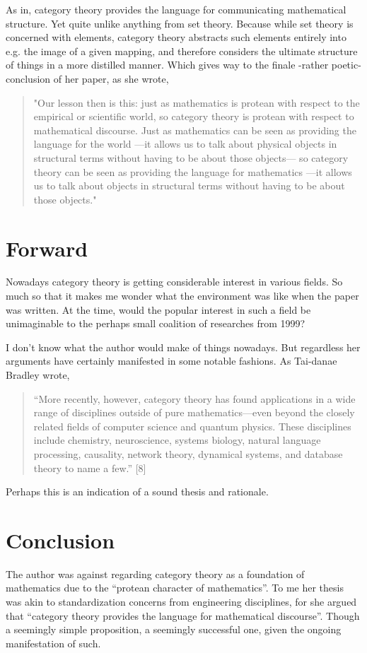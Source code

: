 As in, category theory provides the language for communicating mathematical structure. Yet quite unlike anything from set theory. Because while set theory is concerned with elements, category theory abstracts such elements entirely into e.g. the image of a given mapping, and therefore considers the ultimate structure of things in a more distilled manner. Which gives way to the finale -rather poetic- conclusion of her paper, as she wrote,

\begin{quotation}
"Our lesson then is this: just as mathematics is protean with respect to the empirical or scientific world, so category theory is protean with respect to mathematical discourse. Just as mathematics can be seen as providing the language for the world —it allows us to talk about physical objects in structural terms without having to be about those objects— so category theory can be seen as providing the language for mathematics —it allows us to talk about objects in structural terms without having to be about those objects."
\end{quotation}

\section*{Forward}

Nowadays category theory is getting considerable interest in various fields. So much so that it makes me wonder what the environment was like when the paper was written. At the time, would the popular interest in such a field be unimaginable to the perhaps small coalition of researches from 1999? 

I don’t know what the author would make of things nowadays. But regardless her arguments have certainly manifested in some notable fashions. As Tai-danae Bradley wrote,
\begin{quotation}
“More recently, however, category theory has found applications in a wide range of disciplines outside of pure mathematics—even beyond the closely related fields of computer science and quantum physics. These disciplines include chemistry, neuroscience, systems biology, natural language processing, causality, network theory, dynamical systems, and database theory to name a few.” [8]
\end{quotation}

Perhaps this is an indication of a sound thesis and rationale. 


\section*{Conclusion}

The author was against regarding category theory as a foundation of mathematics due to the “protean character of mathematics”. To me her thesis was akin to standardization concerns from engineering disciplines, for she argued that “category theory provides the language for mathematical discourse”. Though a seemingly simple proposition, a seemingly successful one, given the ongoing manifestation of such.


